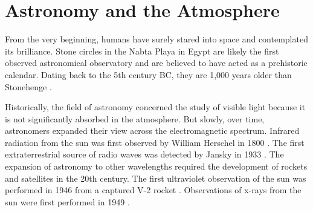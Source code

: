 \section{Astronomy and the Atmosphere}

From the very beginning, humans have surely stared into space and
contemplated its brilliance.  Stone circles in the Nabta Playa in
Egypt are likely the first observed astronomical observatory and
are believed to have acted as a prehistoric calendar.  Dating back
to the 5th century BC, they are 1,000 years older than Stonehenge
\citep{mck-mahille_2007_astronomy-nabta}.

Historically, the field of astronomy concerned the study of visible light
because it is not significantly absorbed in the atmosphere.  But slowly,
over time, astronomers expanded their view across the electromagnetic
spectrum.  Infrared radiation from the sun was first observed by William
Herschel in 1800 \citep{herschel_1800_experiments-refrangibility}.
The first extraterrestrial source of radio waves was detected
by Jansky in 1933 \citep{jansky_1933_electrical-disturbances}.
The expansion of astronomy to other wavelengths required the
development of rockets and satellites in the 20th century.
The first ultraviolet observation of the sun was performed in 1946
from a captured V-2 rocket \citep{baum_1946_ultraviolet-spectrum}.
Observations of x-rays from the sun were first performed in 1949
\citep{burnight_1949_x-radiation-atmosphere}.
